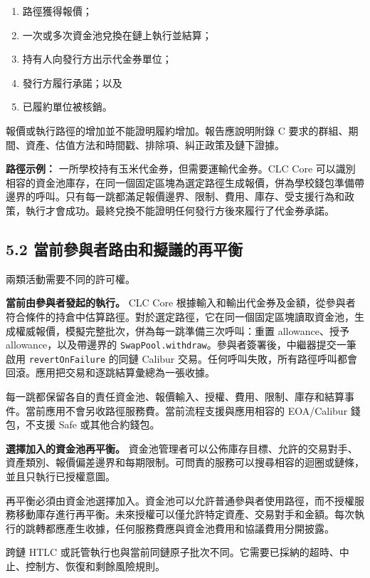 \documentclass[11pt]{article}
\begin{document}
\begin{enumerate}[leftmargin=*]
\item 路徑獲得報價；
\item 一次或多次資金池兌換在鏈上執行並結算；
\item 持有人向發行方出示代金券單位；
\item 發行方履行承諾；以及
\item 已履約單位被核銷。
\end{enumerate}
報價或執行路徑的增加並不能證明履約增加。報告應說明附錄 C 要求的群組、期間、資產、估值方法和時間戳、排除項、糾正政策及鏈下證據。

\textbf{路徑示例：} 一所學校持有玉米代金券，但需要運輸代金券。CLC Core 可以識別相容的資金池庫存，在同一個固定區塊為選定路徑生成報價，併為學校錢包準備帶邊界的呼叫。只有每一跳都滿足報價邊界、限制、費用、庫存、受支援行為和政策，執行才會成功。最終兌換不能證明任何發行方後來履行了代金券承諾。

\subsection*{5.2 當前參與者路由和擬議的再平衡}

兩類活動需要不同的許可權。

\textbf{當前由參與者發起的執行。} CLC Core 根據輸入和輸出代金券及金額，從參與者符合條件的持倉中估算路徑。對於選定路徑，它在同一個固定區塊讀取資金池，生成權威報價，模擬完整批次，併為每一跳準備三次呼叫：重置 allowance、授予 allowance，以及帶邊界的 \texttt{SwapPool.withdraw}。參與者簽署後，中繼器提交一筆啟用 \texttt{revertOnFailure} 的同鏈 Calibur 交易。任何呼叫失敗，所有路徑呼叫都會回滾。應用把交易和逐跳結算彙總為一張收據。

每一跳都保留各自的責任資金池、報價輸入、授權、費用、限制、庫存和結算事件。當前應用不會另收路徑服務費。當前流程支援與應用相容的 EOA/Calibur 錢包，不支援 Safe 或其他合約錢包。

\textbf{選擇加入的資金池再平衡。} 資金池管理者可以公佈庫存目標、允許的交易對手、資產類別、報價偏差邊界和每期限制。可問責的服務可以搜尋相容的迴圈或鏈條，並且只執行已授權意圖。

再平衡必須由資金池選擇加入。資金池可以允許普通參與者使用路徑，而不授權服務移動庫存進行再平衡。未來授權可以僅允許特定資產、交易對手和金額。每次執行的跳轉都應產生收據，任何服務費應與資金池費用和協議費用分開披露。

跨鏈 HTLC 或託管執行也與當前同鏈原子批次不同。它需要已採納的超時、中止、控制方、恢復和剩餘風險規則。
\end{document}
